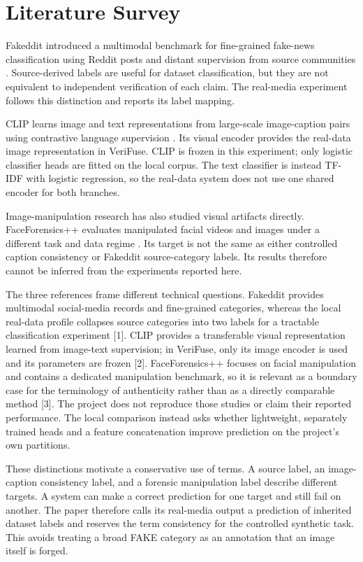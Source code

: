 \documentclass[conference]{IEEEtran}
\begin{document}
\section{Literature Survey}
Fakeddit introduced a multimodal benchmark for fine-grained fake-news classification using Reddit posts and distant supervision from source communities \cite{nakamura}. Source-derived labels are useful for dataset classification, but they are not equivalent to independent verification of each claim. The real-media experiment follows this distinction and reports its label mapping.

CLIP learns image and text representations from large-scale image-caption pairs using contrastive language supervision \cite{radford}. Its visual encoder provides the real-data image representation in VeriFuse. CLIP is frozen in this experiment; only logistic classifier heads are fitted on the local corpus. The text classifier is instead TF-IDF with logistic regression, so the real-data system does not use one shared encoder for both branches.

Image-manipulation research has also studied visual artifacts directly. FaceForensics++ evaluates manipulated facial videos and images under a different task and data regime \cite{rossler}. Its target is not the same as either controlled caption consistency or Fakeddit source-category labels. Its results therefore cannot be inferred from the experiments reported here.

The three references frame different technical questions. Fakeddit provides multimodal social-media records and fine-grained categories, whereas the local real-data profile collapses source categories into two labels for a tractable classification experiment [1]. CLIP provides a transferable visual representation learned from image-text supervision; in VeriFuse, only its image encoder is used and its parameters are frozen [2]. FaceForensics++ focuses on facial manipulation and contains a dedicated manipulation benchmark, so it is relevant as a boundary case for the terminology of authenticity rather than as a directly comparable method [3]. The project does not reproduce those studies or claim their reported performance. The local comparison instead asks whether lightweight, separately trained heads and a feature concatenation improve prediction on the project's own partitions.

These distinctions motivate a conservative use of terms. A source label, an image-caption consistency label, and a forensic manipulation label describe different targets. A system can make a correct prediction for one target and still fail on another. The paper therefore calls its real-media output a prediction of inherited dataset labels and reserves the term consistency for the controlled synthetic task. This avoids treating a broad FAKE category as an annotation that an image itself is forged.
\end{document}
